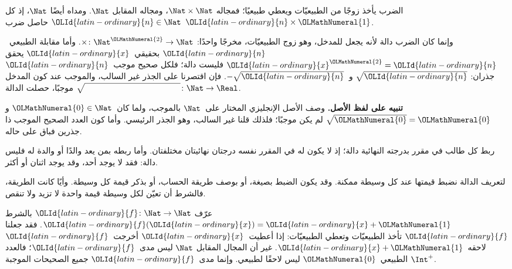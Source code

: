 \documentclass[../../../include/open-logic-section]{subfiles}
\begin{document}
\begin{ex}
الضرب يأخذ زوجًا من الطبيعيّات ويعطي طبيعيًا؛ فمجاله
$\Nat \times \Nat$، ومجاله المقابل $\Nat$. ومداه أيضًا $\Nat$،
إذ كل ${\OLId{latin-ordinary}{n}} \in \Nat$ حاصل ضرب ${\OLId{latin-ordinary}{n}} \times {\OLMathNumeral{1}}$.
\end{ex}

\begin{ex}
وإنما كان الضرب دالة لأنه يجعل للمدخل، وهو زوج الطبيعيّات،
مخرجًا واحدًا: $\times \colon \Nat^{\OLMathNumeral{2}} \to \Nat$.
وأما مقابلة الطبيعي~${\OLId{latin-ordinary}{n}}$ بحقيقي~${\OLId{latin-ordinary}{x}}$ يحقق ${\OLId{latin-ordinary}{x}}^{\OLMathNumeral{2}} = {\OLId{latin-ordinary}{n}}$ فليست دالة؛
فلكل صحيح موجب~${\OLId{latin-ordinary}{n}}$ جذران: $\sqrt{{\OLId{latin-ordinary}{n}}}$ و~$-\sqrt{{\OLId{latin-ordinary}{n}}}$.
فإن اقتصرنا على الجذر غير السالب، والموجب عند كون المدخل موجبًا،
حصلت الدالة $\sqrt{\phantom{{\OLId{latin-looped}{X}}}} \colon \Nat \to \Real$.
\end{ex}

\begin{explain}
\textbf{تنبيه على لفظ الأصل.} وصف الأصل الإنجليزي المختار على~$\Nat$
بالموجب، ولما كان~${\OLMathNumeral{0}}\in\Nat$ و$\sqrt{{\OLMathNumeral{0}}}={\OLMathNumeral{0}}$ لم يكن موجبًا؛ فلذلك قلنا غير السالب، وهو الجذر
الرئيسي. وأما كون العدد الصحيح الموجب ذا جذرين فباق على حاله.
\end{explain}

\begin{ex}
ربط كل طالب في مقرر بدرجته النهائية دالة؛ إذ لا يكون له في المقرر
نفسه درجتان نهائيتان مختلفتان. وأما ربطه بمن يعد والدًا أو والدة
له فليس دالة: فقد لا يوجد أحد، وقد يوجد اثنان أو أكثر.
\end{ex}

\begin{explain}
لتعريف الدالة نضبط قيمتها عند كل وسيطة ممكنة. وقد يكون الضبط بصيغة،
أو بوصف طريقة الحساب، أو بذكر قيمة كل وسيطة. وأيًا كانت الطريقة،
فالشرط أن تعيّن لكل وسيطة قيمة واحدة لا تزيد ولا تنقص.
\end{explain}

\begin{ex}
عرّف ${\OLId{latin-ordinary}{f}} \colon \Nat \to \Nat$ بالشرط ${\OLId{latin-ordinary}{f}}({\OLId{latin-ordinary}{x}}) = {\OLId{latin-ordinary}{x}}+{\OLMathNumeral{1}}$.
فقد جعلنا ${\OLId{latin-ordinary}{f}}$ تأخذ الطبيعيّات وتعطي الطبيعيّات: إذا أعطيت~${\OLId{latin-ordinary}{x}}$
أخرجت~${\OLId{latin-ordinary}{f}}$ لاحقه~${\OLId{latin-ordinary}{x}}+{\OLMathNumeral{1}}$. غير أن المجال المقابل $\Nat$ ليس
مدى~${\OLId{latin-ordinary}{f}}$؛ فالعدد الطبيعي~${\OLMathNumeral{0}}$ ليس لاحقًا لطبيعي. وإنما مدى~${\OLId{latin-ordinary}{f}}$
جميع الصحيحات الموجبة $\Int^{+}$.
\end{ex}
\end{document}
